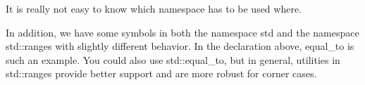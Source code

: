 \begin{itemize}
It is really not easy to know which namespace has to be used where.

In addition, we have some symbols in both the namespace std and the namespace std::ranges with slightly different behavior. In the declaration above, equal\_to is such an example. You could also use std::equal\_to, but in general, utilities in std::ranges provide better support and are more robust for corner cases.
\end{itemize}














